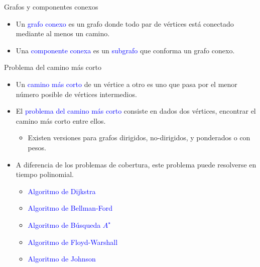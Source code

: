 \documentclass{beamer} %
\newcommand{\blue}[1]{\textcolor{blue}{#1}}
\begin{document}
\begin{frame}{Grafos y componentes conexos}
    \begin{itemize}
        \item<1-> Un \blue{grafo conexo} es un grafo donde todo par de vértices está conectado mediante al menos un camino.
        \item<2-> Una \blue{componente conexa} es un \blue{subgrafo} que conforma un grafo conexo.
    \end{itemize}
\end{frame}

\begin{frame}{Problema del camino más corto}
    \begin{itemize}
        \item<1-> Un \blue{camino más corto} de un vértice a otro es uno que pasa por el menor número posible de vértices intermedios.
        \item<2-> El \blue{problema del camino más corto} consiste en dados dos vértices, encontrar el camino más corto entre ellos.
        \begin{itemize}
            \item<3-> Existen versiones para grafos dirigidos, no-dirigidos, y ponderados o con pesos.
        \end{itemize}
        \item<4-> A diferencia de los problemas de cobertura, este problema puede resolverse en tiempo polinomial.
        \begin{itemize}
          \item \blue{Algoritmo de Dijkstra}
          \item \blue{Algoritmo de Bellman-Ford}
          \item \blue{Algoritmo de Búsqueda $A^{\star}$}
          \item \blue{Algoritmo de Floyd-Warshall}
          \item \blue{Algoritmo de Johnson}
        \end{itemize}
    \end{itemize}
\end{frame}
\end{document}
